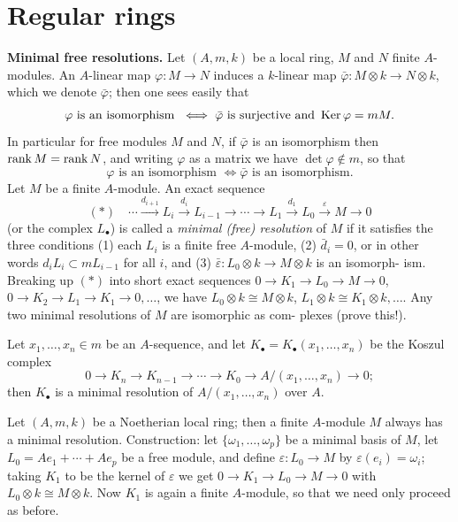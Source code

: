 \section{Regular rings}\label{sec:19}

\textbf{Minimal free resolutions.} Let $(A, m, k)$ be a local ring, $M$ and $N$ finite
$A$-modules. An $A$-linear map $\varphi\colon M \to N$ induces a $k$-linear map
$\bar{\varphi}\colon M \otimes k \to N \otimes k$, which we denote $\bar{\varphi}$; then one sees easily that
\[
  \varphi \text{ is an isomorphism } \iff \bar{\varphi} \text{ is surjective and } \operatorname{Ker} \varphi = mM.
\]
In particular for free modules $M$ and $N$, if $\bar{\varphi}$ is an isomorphism then $\operatorname{rank}
M = \operatorname{rank} N$, and writing $\varphi$ as a matrix we have $\det \varphi \notin m$, so that
\[
  \varphi \text{ is an isomorphism } \iff \bar{\varphi} \text{ is an isomorphism}.
\]
Let $M$ be a finite $A$-module. An exact sequence
\[
  (*) \quad \cdots \xrightarrow{d_{i+1}} L_i \xrightarrow{d_i} L_{i-1} \to \cdots \to L_1 \xrightarrow{d_1} L_0 \xrightarrow{\varepsilon} M \to 0
\]
(or the complex $L_\bullet$) is called a \emph{minimal (free) resolution} of $M$ if it satisfies the
three conditions (1) each $L_i$ is a finite free $A$-module, (2) $\bar{d}_i = 0$, or in other
words $d_iL_i \subset mL_{i-1}$ for all $i$, and (3) $\bar{\varepsilon}\colon L_0 \otimes k \to M \otimes k$ is an isomorph-
ism. Breaking up $(*)$ into short exact sequences $0 \to K_1 \to L_0 \to M \to 0$,
$0 \to K_2 \to L_1 \to K_1 \to 0, \ldots$, we have $L_0 \otimes k \cong M \otimes k$,
$L_1 \otimes k \cong K_1 \otimes k, \ldots$. Any two minimal resolutions of $M$ are isomorphic as com-
plexes (prove this!).

\begin{example*}
Let $x_1, \ldots, x_n \in m$ be an $A$-sequence, and let $K_\bullet = K_\bullet(x_1, \ldots, x_n)$
be the Koszul complex
\[
  0 \to K_n \to K_{n-1} \to \cdots \to K_0 \to A/(x_1, \ldots, x_n) \to 0;
\]
then $K_\bullet$ is a minimal resolution of $A/(x_1, \ldots, x_n)$ over $A$.
\end{example*}

Let $(A, m, k)$ be a Noetherian local ring; then a finite $A$-module $M$
always has a minimal resolution. Construction: let $\{\omega_1, \ldots, \omega_p\}$ be a
minimal basis of $M$, let $L_0 = Ae_1 + \cdots + Ae_p$ be a free module, and define
$\varepsilon\colon L_0 \to M$ by $\varepsilon(e_i) = \omega_i$; taking $K_1$ to be the kernel of $\varepsilon$ we get
$0 \to K_1 \to L_0 \to M \to 0$ with $L_0 \otimes k \cong M \otimes k$. Now $K_1$ is again a
finite $A$-module, so that we need only proceed as before.

